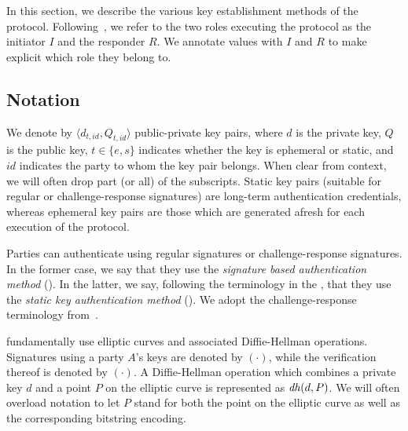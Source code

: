 In this section, we describe the various key establishment methods of the
\mEdhoc{} protocol.
%
Following~\cite{Norr21}, we refer to the two roles executing the protocol as
the initiator $I$ and the responder $R$.
%
We annotate values with $I$ and $R$ to make explicit which role they belong to.
%

\subsection{Notation}
\label{sec:notation}
We denote by $\langle d_{t, \mathit{id}}, Q_{t, \mathit{id}}\rangle$
public-private key pairs, where $d$ is the private key, $Q$ is the public key,
$t \in \{e, s\}$ indicates whether the key is ephemeral or static,
and $\mathit{id}$ indicates the party to whom the key pair belongs.
%
When clear from context, we will often drop part (or all) of the subscripts.
%
Static key pairs (suitable for regular or challenge-response signatures)
are long-term authentication credentials, whereas ephemeral key pairs are those
which are generated afresh for each execution of the protocol.
%

Parties can authenticate using regular signatures or challenge-response
signatures.
%
In the former case, we say that they use the
\emph{signature based authentication method} (\mSig{}).
%
In the latter, we say, following the terminology in the \mSpec{},
that they use the \emph{static key authentication method} (\mStat{}).
%
We adopt the challenge-response terminology
from~\cite{DBLP:conf/crypto/Krawczyk05}.
%

\mEdhoc{} fundamentally use elliptic curves and associated Diffie-Hellman
operations.
%
Signatures using a party $A$'s keys are denoted by $(\cdot)$, while
the verification thereof is denoted by $(\cdot)$.
%
A Diffie-Hellman operation which combines a private key $d$ and a point $P$
on the elliptic curve is represented as $\mathit{dh}(d, P)$.
%
We will often overload notation to let $P$ stand for both the point on the
elliptic curve as well as the corresponding bitstring encoding.
%
%
%

